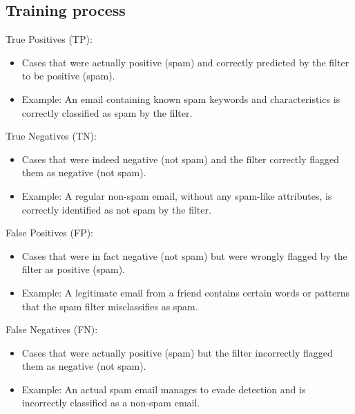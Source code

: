 \subsection{Training process}
True Positives (TP):
\begin{itemize}
  \item Cases that were actually positive (spam) and correctly predicted by the filter to be positive (spam).
  \item Example: An email containing known spam keywords and characteristics is correctly classified as spam by the filter.
\end{itemize}

True Negatives (TN):
\begin{itemize}
  \item Cases that were indeed negative (not spam) and the filter correctly flagged them as negative (not spam).
  \item Example: A regular non-spam email, without any spam-like attributes, is correctly identified as not spam by the filter.
\end{itemize}

False Positives (FP):
\begin{itemize}
  \item Cases that were in fact negative (not spam) but were wrongly flagged by the filter as positive (spam).
  \item Example: A legitimate email from a friend contains certain words or patterns that the spam filter misclassifies as spam.
\end{itemize}

False Negatives (FN):
\begin{itemize}
  \item Cases that were actually positive (spam) but the filter incorrectly flagged them as negative (not spam).
  \item Example: An actual spam email manages to evade detection and is incorrectly classified as a non-spam email.
\end{itemize}

